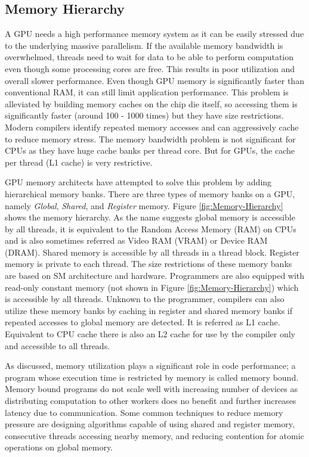 \subsection{Memory Hierarchy}
A GPU needs a high performance memory system as it can be easily stressed due to the underlying massive parallelism.
If the available memory bandwidth is overwhelmed, threads need to wait for data to be able to perform computation even though some processing cores are free. This results in poor utilization and overall slower performance.
Even though GPU memory is significantly faster than conventional RAM, it can still limit application performance.
This problem is alleviated by building memory caches on the chip die itself, so accessing them is significantly faster (around 100 - 1000 times) but they have size restrictions.
Modern compilers identify repeated memory accesses and can aggressively cache to reduce memory stress.
The memory bandwidth problem is not significant for CPUs as they have huge cache banks per thread core. But for GPUs, the cache per thread (L1 cache) is very restrictive.

GPU memory architects have attempted to solve this problem by adding hierarchical memory banks. There are three types of memory banks on a GPU, namely \textit{Global}, \textit{Shared}, and \textit{Register} memory.
Figure \ref{fig:Memory-Hierarchy} shows the memory hierarchy. As the name suggests global memory is accessible by all threads, it is equivalent to the Random Access Memory (RAM) on CPUs and is also sometimes referred as Video RAM (VRAM) or Device RAM (DRAM).
Shared memory is accessible by all threads in a thread block.
Register memory is private to each thread.
The size restrictions of these memory banks are based on SM architecture and hardware.
Programmers are also equipped with read-only constant memory (not shown in Figure \ref{fig:Memory-Hierarchy}) which is accessible by all threads.
Unknown to the programmer, compilers can also utilize these memory banks by caching in register and shared memory banks if repeated accesses to global memory are detected. It is referred as L1 cache. Equivalent to CPU cache there is also an L2 cache for use by the compiler only and accessible to all threads.

As discussed, memory utilization plays a significant role in code performance; a program whose execution time is restricted by memory is called memory bound. Memory bound programs do not scale well with increasing number of devices as distributing computation to other workers does no benefit and further increases latency due to communication.
Some common techniques to reduce memory pressure are designing algorithms capable of using shared and register memory, consecutive threads accessing nearby memory, and reducing contention for atomic operations on global memory.



